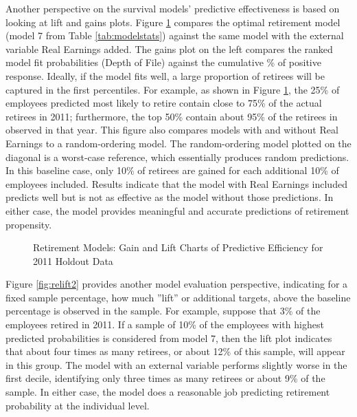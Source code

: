  Another perspective on the survival models' predictive effectiveness is based on looking at lift and gains plots. Figure \ref{fig:regainlift} compares the optimal retirement model  (model 7 from Table \ref{tab:modelstats}) against the same model with the external variable Real Earnings added. The gains plot on the left compares the ranked model fit probabilities (Depth of File) against the cumulative \% of positive response.  Ideally, if the model fits well, a large proportion of retirees will be captured in the first percentiles. For example, as shown in Figure \ref{fig:regainlift}, the 25\% of employees predicted most likely to retire contain close to 75\% of the actual retirees in 2011; furthermore, the top 50\% contain about 95\% of the retirees in observed in that year. This figure also compares models with and without Real Earnings to a random-ordering model. The random-ordering model plotted on the diagonal is a worst-case reference, which essentially produces random predictions. In this baseline case, only 10\% of retirees are gained for each additional 10\% of employees included. Results indicate that the model with Real Earnings included predicts well but is not as effective as the model without those predictions. In either case, the model provides meaningful and accurate predictions of retirement propensity. 
	 \begin{figure}[h!]
	 	\centering
	 	\caption{Retirement Models: Gain and Lift Charts of Predictive Efficiency for 2011 Holdout Data}
	 	\label{fig:regainlift}
	 \end{figure}
 Figure \ref{fig:relift2} provides another model evaluation perspective, indicating for a fixed sample percentage, how much ”lift” or additional targets, above the baseline percentage is observed in the sample. For example, suppose that 3\% of the employees retired in 2011. If a sample of 10\% of the employees with highest predicted probabilities is considered from model 7, then the lift plot indicates that about four times as many retirees, or about 12\% of this sample, will appear in this group. The model with an external variable performs slightly worse in the first decile, identifying only three times as many retirees or about 9\% of the sample. In either case, the model does a reasonable job predicting retirement probability at the individual level\citep{kuhn2013}.  %
 
